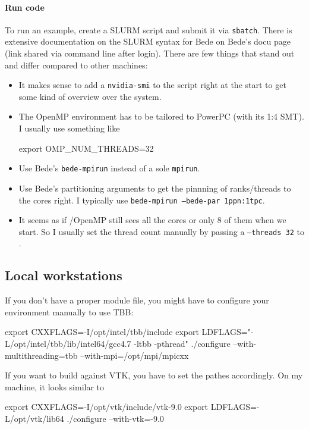 \paragraph{Run code}

To run an example, create a SLURM script and submit it via \texttt{sbatch}.
There is extensive documentation on the SLURM syntax for Bede on Bede's docu
page (link shared via command line after login).
There are few things that stand out and differ compared to other machines:

\begin{itemize}
  \item It makes sense to add a \texttt{nvidia-smi} to the script right at the
  start to get some kind of overview over the system.
  \item The OpenMP environment has to be tailored to PowerPC (with its 1:4 SMT).
  I usually use something like
  \begin{code}
export OMP_NUM_THREADS=32  
  \end{code}
  \item Use Bede's \texttt{bede-mpirun} instead of a sole \texttt{mpirun}.
  \item Use Bede's partitioning arguments to get the pinnning of ranks/threads
  to the cores right. I typically use \texttt{bede-mpirun --bede-par 1ppn:1tpc}.
  \item It seems as if \Peano/OpenMP still sees all the cores or only 8 of them
  when we start. So I usually set the thread count manually by passing a
  \texttt{--threads 32} to \Peano.
\end{itemize}



\subsection{Local workstations}



If you don't have a proper module file, you might have to configure your environment manually to use TBB:
\begin{code}
 export CXXFLAGS=-I/opt/intel/tbb/include
 export LDFLAGS="-L/opt/intel/tbb/lib/intel64/gcc4.7 -ltbb -pthread"
 ./configure --with-multithreading=tbb --with-mpi=/opt/mpi/mpicxx
\end{code}


If you want to build against VTK, you have to set the pathes accordingly. 
On my machine, it looks similar to
\begin{code}
 export CXXFLAGS=-I/opt/vtk/include/vtk-9.0
 export LDFLAGS=-L/opt/vtk/lib64
 ./configure --with-vtk=-9.0
\end{code}


